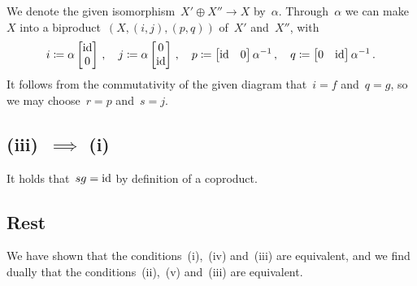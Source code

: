 We denote the given isomorphism~$X' \oplus X'' \to X$ by~$\alpha$.
Through~$\alpha$ we can make~$X$ into a biproduct~$(X,(i,j),(p,q))$ of~$X'$ and~$X''$, with
\[
            i
  \coloneqq  \alpha
            \begin{bmatrix}
              \operatorname{id} \\
              0
            \end{bmatrix} \,,
  \quad
            j
  \coloneqq  \alpha
            \begin{bmatrix}
              0   \\
              \operatorname{id}
            \end{bmatrix} \,,
  \quad
            p
  \coloneqq  \begin{bmatrix}
              \operatorname{id} & 0
            \end{bmatrix}
            \alpha^{-1} \,,
  \quad
            q
  \coloneqq  \begin{bmatrix}
              0 & \operatorname{id}
            \end{bmatrix}
            \alpha^{-1} \,.
\]
It follows from the commutativity of the given diagram that~$i = f$ and~$q = g$, so we may choose~$r = p$ and~$s = j$.





\subsection*{(iii)~$\implies$ (i)}

It holds that~$sg = \operatorname{id}$ by definition of a coproduct.





\subsection*{Rest}

We have shown that the conditions~(i),~(iv) and~(iii) are equivalent, and we find dually that the conditions~(ii),~(v) and~(iii) are equivalent.


